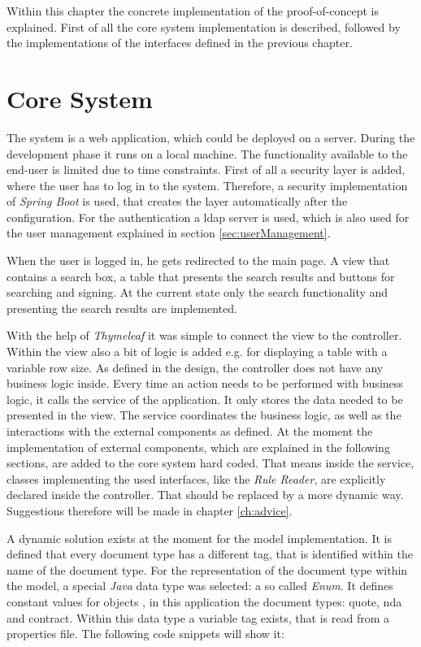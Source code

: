 Within this chapter the concrete implementation of the proof-of-concept is explained. First of all the core system implementation is described, followed by the implementations of the interfaces defined in the previous chapter. 

\section{Core System}
The system is a web application, which could be deployed on a server. During the development phase it runs on a local machine. 
The functionality available to the end-user is limited due to time constraints. 
First of all a security layer is added, where the user has to log in to the system. Therefore, a security implementation of \textit{Spring Boot} is used, that creates the layer automatically after the configuration. For the authentication a \gls{ldap} server is used, which is also used for the user management explained in section \ref{sec:userManagement}.

When the user is logged in, he gets redirected to the main page. A view that contains a search box, a table that presents the search results and buttons for searching and signing. At the current state only the search functionality and presenting the search results are implemented.

With the help of \textit{Thymeleaf} it was simple to connect the view to the controller. Within the view also a bit of logic is added e.g. for displaying a table with a variable row size. \newline
As defined in the design, the controller does not have any business logic inside. Every time an action needs to be performed with business logic, it calls the service of the application. It only stores the data needed to be presented in the view. \newline
The service coordinates the business logic, as well as the interactions with the external components as defined. At the moment the implementation of external components, which are explained in the following sections, are added to the core system hard coded. That means inside the service, classes implementing the used interfaces, like the \textit{Rule Reader}, are explicitly declared inside the controller. That should be replaced by a more dynamic way. Suggestions therefore will be made in chapter \ref{ch:advice}.

A dynamic solution exists at the moment for the model implementation. It is defined that every document type has a different tag, that is identified within the name of the document type. For the representation of the document type within the model, a special \textit{Java} data type was selected: a so called \textit{Enum}. It defines constant values for objects \parencite{enum2048}, in this application the document types: quote, \gls{nda} and contract. Within this data type a variable tag exists, that is read from a properties file. The following code snippets will show it:

